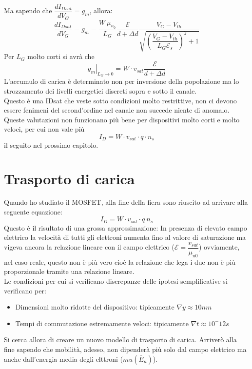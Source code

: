Ma sapendo che $\dfrac{dI_{Dsat}}{dV_G}=g_m$, allora:
\begin{equation}
    \dfrac{dI_{Dsat}}{dV_G}=g_m=\dfrac{W\ \mu_{n_0}}{L_G}\dfrac{\mathcal{E}}
    {d+\Delta d} \dfrac{V_G-V_{th}}{\sqrt{\left( \dfrac{V_G-V_{th}}{L_G \mathcal{E}_s}\right)^2+1}}
\end{equation}
Per $L_G$ molto corti si avrà che
\begin{equation}
    \left. g_m\right|_{L_G \rightarrow 0}= W\cdot v_{sat} \dfrac{\mathcal{E}}
    {d+\Delta d}
\end{equation}
L'accumulo di carica è determinato non per inversione della popolazione ma lo strozzamento dei livelli energetici discreti sopra e sotto il canale.\\
Questo è una IDsat che veste sotto condizioni molto restrittive, non ci devono essere fenimeni del second'ordine nel canale non succede niente di anomalo.\\
Queste valutazioni non funzionano più bene per dispositivi molto corti e molto veloci, per cui non vale più
%
\begin{equation}
    I_D=W \cdot v_{sat}\cdot q \cdot n_s
\end{equation}
%
il seguito nel prossimo capitolo.

\cleardoublepage
%
\section{Trasporto di carica}
%
Quando ho studiato il MOSFET, alla fine della fiera sono riuscito ad arrivare alla seguente equazione:
%
\begin{equation}
    I_D=W \cdot v_{sat}\cdot q\ n_{s}
\end{equation}
%
Questo è il risultato di una grossa approssimazione: In presenza di elevato campo elettrico la velocità di tutti gli elettroni aumenta fino al valore di saturazione ma vigeva ancora la relazione lineare con il campo elettrico ($\mathcal{E}=\dfrac{v_{sat}}{\mu_{n0}}$) ovviamente, nel caso reale,  questo non è più vero cioè la relazione che lega i due non è più proporzionale  tramite una relazione lineare.\\
Le condizioni per cui si verificano discrepanze delle ipotesi semplificative si verificano per:
%
\begin{itemize}
    \item Dimensioni molto ridotte del dispositivo: tipicamente $\nabla y \approx 10nm$
    \item  Tempi di commutazione estremamente veloci: tipicamente $\nabla t \approx 10^-{12}s$
\end{itemize}
%
Si cerca allora di creare un nuovo modello di trasporto di carica. Arriverò alla fine sapendo che mobilità, adesso, non dipenderà più solo dal campo elettrico ma anche dall'energia media degli elttroni ($mu(\overline{E}_n)$).
%
